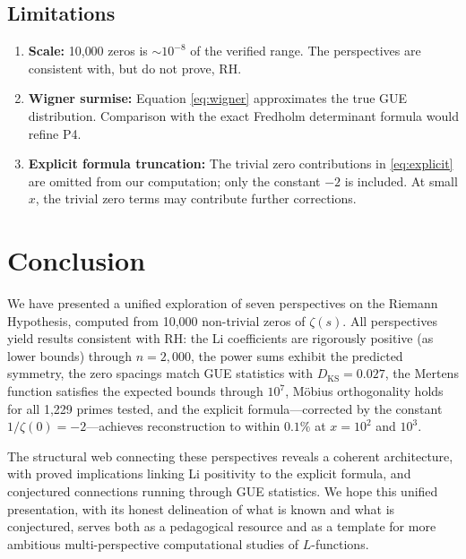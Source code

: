 \documentclass[11pt,a4paper]{article}
\theoremstyle{definition}
\begin{document}
\subsection{Limitations}

\begin{enumerate}[label=(\roman*)]
  \item \textbf{Scale:} 10{,}000 zeros is $\sim 10^{-8}$ of the verified range. The perspectives are consistent with, but do not prove, RH.
  \item \textbf{Wigner surmise:} Equation \eqref{eq:wigner} approximates the true GUE distribution. Comparison with the exact Fredholm determinant formula \cite{Mehta2004} would refine P4.
  \item \textbf{Explicit formula truncation:} The trivial zero contributions in \eqref{eq:explicit} are omitted from our computation; only the constant $-2$ is included. At small $x$, the trivial zero terms may contribute further corrections.
\end{enumerate}

\section{Conclusion}
\label{sec:conclusion}

We have presented a unified exploration of seven perspectives on the Riemann Hypothesis, computed from 10{,}000 non-trivial zeros of $\zeta(s)$. All perspectives yield results consistent with RH: the Li coefficients are rigorously positive (as lower bounds) through $n = 2{,}000$, the power sums exhibit the predicted symmetry, the zero spacings match GUE statistics with $D_{\mathrm{KS}} = 0.027$, the Mertens function satisfies the expected bounds through $10^7$, M\"obius orthogonality holds for all 1{,}229 primes tested, and the explicit formula---corrected by the constant $1/\zeta(0) = -2$---achieves reconstruction to within $0.1\%$ at $x = 10^2$ and $10^3$.

The structural web connecting these perspectives reveals a coherent architecture, with proved implications linking Li positivity to the explicit formula, and conjectured connections running through GUE statistics. We hope this unified presentation, with its honest delineation of what is known and what is conjectured, serves both as a pedagogical resource and as a template for more ambitious multi-perspective computational studies of $L$-functions.
\end{document}
